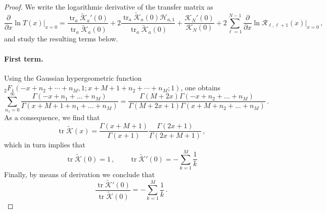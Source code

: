 \documentclass[11pt]{article}
\numberwithin{equation}{section}
\newcommand{\M}{M}
\newcommand{\N}{N}
\newcommand{\eR}{\mathcal{R}}
\newcommand{\KhatFull}{\mathcal{K}}
\newcommand{\Kfull}{\widetilde{\mathcal{K}}}
\DeclareMathOperator{\tr}{\text{tr}}
\begin{document}
\begin{proof}
We write the logarithmic derivative of the transfer matrix as
\begin{equation}\label{eq:logderiv}
\frac{\partial}{\partial x}\ln T(x)\big|_{x=0}=\frac{\tr_a \Kfull_a'(0)}{\tr_a \Kfull_a(0)}+2\frac{\tr_a \Kfull_a(0)\mathcal{H}_{a,1}}{\tr_a \Kfull_a(0)}+\frac{\KhatFull_\N'(0)}{\KhatFull_\N(0)}+2\sum_{\ell=1}^{\N-1}\frac{\partial}{\partial x}\ln \eR_{\ell,\ell+1}(x)\big|_{x=0}\,,
\end{equation}
and study the resulting terms below.
\paragraph{First term.}
 Using the Gaussian hypergeometric function ${}_2F_1(-x + n_2 + \cdots + n_{\M},1;x + M + 1 + n_2 + \cdots + n_M;1)$, one obtains
\begin{equation}\sum_{n_1=0}^\infty \frac{\Gamma(-x +n_1+\ldots+n_\M)}{\Gamma(x+\M+1+n_1+\ldots+n_\M)}=\frac{\Gamma (M+2 x) \Gamma (-x+n_2+\ldots+n_\M)}{\Gamma (M+2 x+1) \Gamma (x+M+n_2+\ldots+n_\M)}\,.
\end{equation}
As a consequence, we find that 
\begin{equation}
 \tr\Kfull(x)=\frac{\Gamma (x+M+ 1)  }{\Gamma (x+1) }\frac{\Gamma (2x+1)  }{\Gamma (2x+M+1) }\,,
\end{equation}
which in turn implies that
\begin{equation}
 \tr\Kfull(0)=1\,,\qquad \tr\Kfull'(0)=-\sum_{k=1}^M\frac{1}{k}
\end{equation}
Finally, by means of derivation we conclude that
\begin{equation}
 \frac{\tr \Kfull'(0)}{\tr \Kfull(0)}=-\sum_{k=1}^M\frac{1}{k}\,.
\end{equation}

\end{proof}
\end{document}
